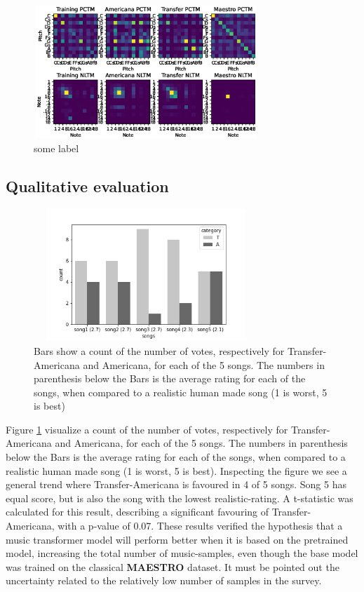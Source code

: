 \documentclass{IEEEtran}
\begin{document}
            \begin{figure}
                \centering
                \includegraphics[width=8.5cm, height=5cm]{PCTMNLTM.eps}
                \caption{some label}
            \end{figure} 
            

    \subsection{Qualitative evaluation}
    
        \begin{figure}[h]
            \centering
            \includegraphics[width=8.5cm, height=5cm]{songs_category.png}
            \caption{Bars show a count of the number of votes, respectively for Transfer-Americana
             and Americana, for each of the 5 songs. The numbers in parenthesis below the Bars
             is the average rating for each of the songs, when compared to a realistic human made
             song (1 is worst, 5 is best)}
             \label{fig:songs}
        \end{figure} 
        Figure \ref{fig:songs} visualize a count of the number of votes, respectively for Transfer-Americana
        and Americana, for each of the 5 songs. The numbers in parenthesis below the Bars
        is the average rating for each of the songs, when compared to a realistic human made
        song (1 is worst, 5 is best). Inspecting the figure we see a general trend where Transfer-Americana is
        favoured in 4 of 5 songs. Song 5 has equal score, but is also the song with the lowest 
        realistic-rating. A t-statistic was calculated for this result, describing a significant favouring of 
        Transfer-Americana, with a p-value of 0.07. These results verified the hypothesis that a music transformer model will perform better when it is based on the pretrained model, increasing the total number of music-samples, even though the base model was trained on the classical \textbf{MAESTRO} dataset. It must be pointed out the uncertainty related to the relatively low number of samples in the survey. 
        
\end{document}
